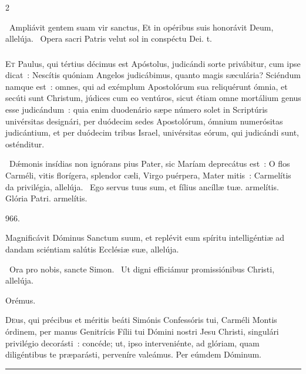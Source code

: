 \documentclass[9pt,twoside]{extarticle}
\begin{document}
\begin{multicols}{2}
{{\begin{tightlist}{}
\item {}~Ampliávit gentem suam vir sanctus, \textred{*} Et in opéribus suis honorávit Deum, allelúja. ~Opera sacri Patris velut sol in conspéctu Dei. t.
\end{tightlist}

\subsubsection*{\center {}}
\lettrine{E}t Paulus, qui tértius décimus est Apóstolus, judicándi sorte privábitur, cum ipse dicat~: Nescítis quóniam Angelos judicábimus, quanto magis sæculária? Sciéndum namque est~: omnes, qui ad exémplum Apostolórum sua reliquérunt ómnia, et secúti sunt Christum, júdices cum eo ventúros, sicut étiam omne mortálium genus esse judicándum~: quia enim duodenário sæpe número solet in Scriptúris univérsitas designári, per duódecim sedes Apostolórum, ómnium numerósitas judicántium, et per duódecim tribus Israel, univérsitas eórum, qui judicándi sunt, osténditur.

\begin{tightlist}{}
\item {}~Dǽmonis insídias non ignórans pius Pater, sic Maríam deprecátus est~: O flos Carméli, vitis florígera, splendor cæli, Virgo puérpera, Mater mitis~: \textred{*} Carmelítis da privilégia, allelúja. ~Ego servus tuus sum, et fílius ancíllæ tuæ. armelítis. Glória Patri. armelítis.
\item {} 966.
\item {} Magnificávit Dóminus Sanctum suum, et replévit eum spíritu intelligéntiæ ad dandam sciéntiam salútis Ecclésiæ suæ, allelúja.
\item {}~Ora pro nobis, sancte Simon. ~Ut digni efficiámur promissiónibus Christi, allelúja.
\item Orémus. \hfill {}
\end{tightlist}
\lettrine{D}eus, qui précibus et méritis beáti Simónis Confessóris tui, Carméli Montis órdinem, per manus Genitrícis Fílii tui Dómini nostri Jesu Christi, singulári privilégio decorásti~: concéde; ut, ipso interveniénte, ad glóriam, quam diligéntibus te præparásti, perveníre valeámus. Per eúmdem Dóminum.

\begin{center}\textcolor{red}{\rule{\linewidth}{0.5pt}} \end{center}

}}
\end{multicols}
\end{document}

